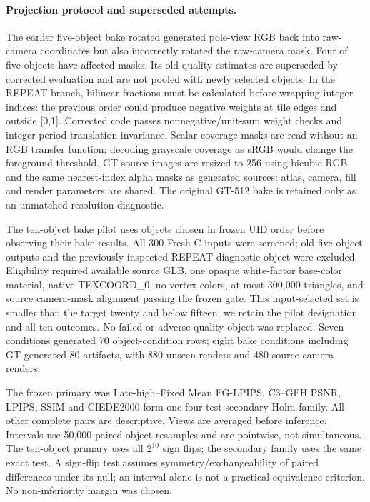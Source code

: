 \documentclass[11pt]{article}
\begin{document}
\paragraph{Projection protocol and superseded attempts.}
The earlier five-object bake rotated generated pole-view RGB back into raw-camera coordinates but also incorrectly rotated the raw-camera mask. Four of five objects have affected masks. Its old quality estimates are superseded by corrected evaluation and are not pooled with newly selected objects. In the REPEAT branch, bilinear fractions must be calculated before wrapping integer indices: the previous order could produce negative weights at tile edges and outside [0,1]. Corrected code passes nonnegative/unit-sum weight checks and integer-period translation invariance. Scalar coverage masks are read without an RGB transfer function; decoding grayscale coverage as sRGB would change the foreground threshold. GT source images are resized to 256 using bicubic RGB and the same nearest-index alpha masks as generated sources; atlas, camera, fill and render parameters are shared. The original GT-512 bake is retained only as an unmatched-resolution diagnostic.

The ten-object bake pilot uses objects chosen in frozen UID order before observing their bake results. All 300 Fresh C inputs were screened; old five-object outputs and the previously inspected REPEAT diagnostic object were excluded. Eligibility required available source GLB, one opaque white-factor base-color material, native TEXCOORD\_0, no vertex colors, at most 300,000 triangles, and source camera-mask alignment passing the frozen gate. This input-selected set is smaller than the target twenty and below fifteen; we retain the pilot designation and all ten outcomes. No failed or adverse-quality object was replaced. Seven conditions generated 70 object-condition rows; eight bake conditions including GT generated 80 artifacts, with 880 unseen renders and 480 source-camera renders.

The frozen primary was Late-high--Fixed Mean FG-LPIPS. C3--GFH PSNR, LPIPS, SSIM and CIEDE2000 form one four-test secondary Holm family. All other complete pairs are descriptive. Views are averaged before inference. Intervals use 50,000 paired object resamples and are pointwise, not simultaneous. The ten-object primary uses all $2^{10}$ sign flips; the secondary family uses the same exact test. A sign-flip test assumes symmetry/exchangeability of paired differences under its null; an interval alone is not a practical-equivalence criterion. No non-inferiority margin was chosen.
\end{document}
